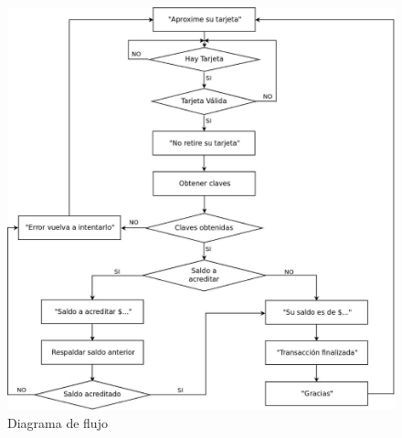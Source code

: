 \bigskip
\begin{figure}[H]
\centering
  \begin{center}
   \includegraphics[scale=.35]{Imagenes/flujo.jpg}
  \end{center}
  \caption{Diagrama de flujo}\label{Fig:HW} 
\end{figure}